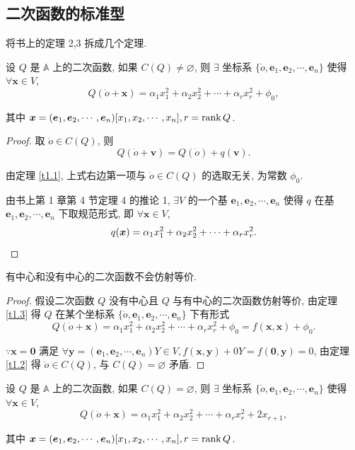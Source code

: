 \documentclass{ctexart}
\begin{document}
\subsection{二次函数的标准型}
将书上的定理 2,3 拆成几个定理.
\begin{theorem}\label{t1.3}
    设 $Q$ 是 $\mathbb{A}$ 上的二次函数, 如果 $C(Q)\neq\varnothing$, 则 $\exists$ 坐标系 $\{\dot{o},\boldsymbol{e}_1,\boldsymbol{e}_2,\cdots,\boldsymbol{e}_n\}$ 使得 $\forall\boldsymbol{x}\in V$,
    \[Q(\dot{o}+\boldsymbol{x})=\alpha_1x^2_1+\alpha_2x^2_2+\cdots+\alpha_rx^2_r+\phi_0,\]

    其中 $\boldsymbol{x}=(\boldsymbol{e}_1,\boldsymbol{e}_2,\cdots,\boldsymbol{e}_n)[x_1,x_2,\cdots,x_n],r=\operatorname{rank} Q$.
\end{theorem}
\begin{proof}
    取 $\dot{o}\in C(Q)$, 则
    \[Q(\dot{o}+\boldsymbol{v})=Q(\dot{o})+q(\boldsymbol{v}).\]

    由定理 \ref{t1.1}, 上式右边第一项与 $\dot{o}\in C(Q)$ 的选取无关, 为常数 $\phi_0$.

    由书上第 1 章第 4 节定理 4 的推论 1, $\exists V$ 的一个基 $\boldsymbol{e}_1,\boldsymbol{e}_2,\cdots,\boldsymbol{e}_n$ 使得 $q$ 在基 $\boldsymbol{e}_1,\boldsymbol{e}_2,\cdots,\boldsymbol{e}_n$ 下取规范形式, 即 $\forall\boldsymbol{x}\in V$,
    \[q(\boldsymbol{x})=\alpha_1x^2_1+\alpha_2x^2_2+\cdots+\alpha_rx^2_r.\qedhere\]
\end{proof}
\begin{lemma}\label{l1.1}
    有中心和没有中心的二次函数不会仿射等价.
\end{lemma}
\begin{proof}
    假设二次函数 $Q$ 没有中心且 $Q$ 与有中心的二次函数仿射等价, 由定理 \ref{t1.3} 得 $Q$ 在某个坐标系 $\{\dot{o},\boldsymbol{e}_1,\boldsymbol{e}_2,\cdots,\boldsymbol{e}_n\}$ 下有形式
    \[Q(\dot{o}+\boldsymbol{x})=\alpha_1x^2_1+\alpha_2x^2_2+\cdots+\alpha_rx^2_r+\phi_0=f(\boldsymbol{x},\boldsymbol{x})+\phi_0.\]

    $\because\boldsymbol{x}=\boldsymbol{0}$ 满足 $\forall\boldsymbol{y}=(\boldsymbol{e}_1,\boldsymbol{e}_2,\cdots,\boldsymbol{e}_n)Y\in V,f(\boldsymbol{x},\boldsymbol{y})+0Y=f(\boldsymbol{0},\boldsymbol{y})=0$, 由定理 \ref{t1.2} 得 $\dot{o}\in C(Q)$, 与 $C(Q)=\varnothing$ 矛盾.
\end{proof}
\begin{theorem}
    设 $Q$ 是 $\mathbb{A}$ 上的二次函数, 如果 $C(Q)=\varnothing$, 则 $\exists$ 坐标系 $\{\dot{o},\boldsymbol{e}_1,\boldsymbol{e}_2,\cdots,\boldsymbol{e}_n\}$ 使得 $\forall\boldsymbol{x}\in V$,
    \[Q(\dot{o}+\boldsymbol{x})=\alpha_1x^2_1+\alpha_2x^2_2+\cdots+\alpha_rx^2_r+2x_{r+1},\]

    其中 $\boldsymbol{x}=(\boldsymbol{e}_1,\boldsymbol{e}_2,\cdots,\boldsymbol{e}_n)[x_1,x_2,\cdots,x_n],r=\operatorname{rank} Q$.
\end{theorem}
\end{document}
